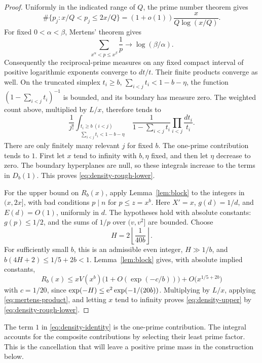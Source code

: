 \begin{proof}
Uniformly in the indicated range of $Q$, the prime number theorem gives
\[
 \#\{p_j:x/Q<p_j\le2x/Q\}
  =(1+o(1))\frac{x}{Q\log(x/Q)}.
\]
For fixed $0<\alpha<\beta$, Mertens' theorem gives
\[
 \sum_{x^\alpha<p\le x^\beta}\frac1p
       \longrightarrow\log(\beta/\alpha).
\]
Consequently the reciprocal-prime measures on any fixed compact
interval of positive logarithmic exponents converge to $dt/t$.
Their finite products converge as well. On the truncated simplex
$t_i\ge b$, $\sum_{i<j}t_i<1-b-\eta$, the function
$(1-\sum_{i<j}t_i)^{-1}$ is bounded, and its boundary has measure
zero. The weighted count above, multiplied by $L/x$, therefore
tends to
\[
 \frac1{j!}
 \int_{\substack{t_i\ge b\ (i<j)\\
                       \sum_{i<j}t_i<1-b-\eta}}
       \frac{1}{1-\sum_{i<j}t_i}\prod_{i<j}\frac{dt_i}{t_i}.
\]
There are only finitely many relevant $j$ for fixed $b$.
The one-prime contribution tends to $1$. First let $x$ tend to
infinity with $b,\eta$ fixed, and then let $\eta$ decrease to zero.
The boundary hyperplanes are null, so these integrals increase to
the terms in $D_b(1)$. This proves \eqref{eq:density-rough-lower}.

For the upper bound on $R_b(x)$, apply Lemma~\ref{lem:block} to
the integers in $(x,2x]$, with bad conditions $p\mid n$ for
$p\le z=x^b$. Here $X'=x$, $g(d)=1/d$, and $E(d)=O(1)$,
uniformly in $d$. The hypotheses hold with absolute constants:
$g(p)\le1/2$, and the sums of $1/p$ over $(v,v^2]$ are bounded.
Choose
\[
 H=2\left\lfloor\frac{1}{40b}\right\rfloor.
\]
For sufficiently small $b$, this is an admissible even integer,
$H\gg1/b$, and $b(4H+2)\le1/5+2b<1$.
Lemma~\ref{lem:block} gives, with absolute implied constants,
\[
 R_b(x)\le xV(x^b)\bigl(1+O(\exp(-c/b))\bigr)
                +O\bigl(x^{1/5+2b}\bigr)
\]
with \(c=1/20\), since \(\exp(-H)\le\mathrm{e}^2\exp(-1/(20b))\).
Multiplying by $L/x$, applying \eqref{eq:mertens-product}, and
letting $x$ tend to infinity proves \eqref{eq:density-upper}
by \eqref{eq:density-rough-lower}.
\end{proof}

The term $1$ in \eqref{eq:density-identity} is the one-prime
contribution. The integral accounts for the composite contributions
by selecting their least prime factor. This is the cancellation
that will leave a positive prime mass in the construction below.
